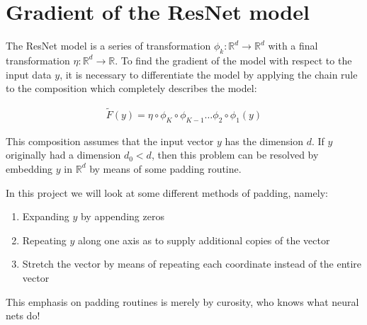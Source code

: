 \section{Gradient of the ResNet model}


The ResNet model is a series of transformation \(\phi_k: \mathbb{R}^{d} \rightarrow \mathbb{R}^{d}\)
with a final transformation \(\eta: \mathbb{R}^{d} \rightarrow \mathbb{R}\).
To find the gradient of the model with respect to the input data \(y\),
it is necessary to differentiate the model by applying the chain rule to the composition which completely describes the model:

\begin{gather*}
    \tilde{F}(y) = \eta \circ \phi_{K} \circ \phi_{K-1} \dots \phi_{2} \circ \phi_1 (y)
\end{gather*}

This composition assumes that the input vector $y$ has the dimension $d$.
If $y$ originally had a dimension $d_0 < d$, then this problem can be resolved by embedding $y$ in $\mathbb{R}^{d}$
by means of some padding routine.

In this project we will look at some different methods of padding, namely:

\begin{enumerate}
    \item Expanding $y$ by appending zeros
    \item Repeating $y$ along one axis as to supply additional copies of the vector
    \item Stretch the vector by means of repeating each coordinate instead of the entire vector
\end{enumerate}

This emphasis on padding routines is merely by curosity, who knows what neural nets do!

